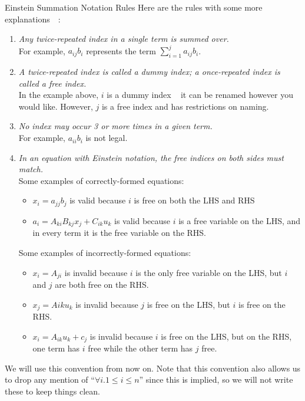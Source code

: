 \documentclass[aspectratio=169,xcolor=dvipsnames]{beamer}
\begin{document}
\begin{frame}{Einstein Summation Notation Rules}
      Here are the rules with some more explanations~{\color{red}~\cite{Khan2023}}:
      \begin{enumerate}
      \item<only@1> \textit{Any twice-repeated index in a single term is summed over.}\\
            For example, $a_{ij}b_i$ represents the term $\sum_{i=1}^j a_{ij}b_i$.
      \item<only@1> \textit{A twice-repeated index is called a dummy index; a once-repeated 
            index is called a free index.}\\
            In the example above, $i$ is a dummy index \textemdash~ it can be renamed
            however you would like. However, $j$ is a free index and has restrictions on naming.
      \item<only@1> \textit{No index may occur 3 or more times in a given term.}\\
            For example, $a_{ii}b_i$ is not legal.
      \item<only@2>{\textit{In an equation with Einstein notation, the free indices on both sides must
            match.}\\

            \noindent Some examples of correctly-formed equations:

            \begin{itemize}
            \item $x_i = a_{jj}b_j$ is valid because $i$ is free on both the LHS and RHS
            \item $a_i = A_{ki}B_{kj}x_j + C_{ik}u_k$ is valid because $i$ is a free variable on
                  the LHS, and in every term it is the free variable on the RHS.
            \end{itemize}

            \noindent Some examples of incorrectly-formed equations:

            \begin{itemize}
            \item $x_i = A_{ji}$ is invalid because $i$ is the only free variable on the LHS, but
                  $i$ and $j$ are both free on the RHS.
            \item $x_j = A{ik}u_k$ is invalid because $j$ is free on the LHS, but $i$ is free on 
                  the RHS.
            \item $x_i = A_{ik}u_k + c_j$ is invalid because $i$ is free on the LHS, but on the 
                  RHS, one term has $i$ free while the other term has $j$ free.
            \end{itemize}}

      \end{enumerate}
      We will use this convention from now on. Note that this convention also allows us
      to drop any mention of ``$\forall i . 1 \leq i \leq n$'' since this is implied, so
      we will not write these to keep things clean.
  \end{frame}
\end{document}
